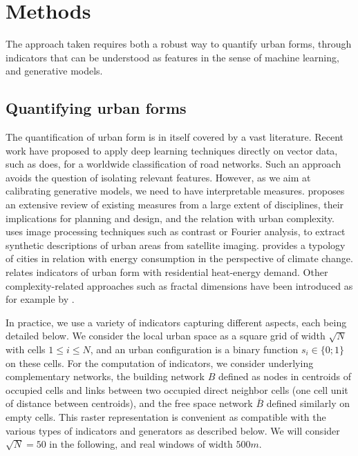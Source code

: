 \documentclass[letterpaper]{article}
\begin{document}
\section{Methods} \label{sec:methods}

The approach taken requires both a robust way to quantify urban forms, through indicators that can be understood as features in the sense of machine learning, and generative models.

\subsection{Quantifying urban forms}

The quantification of urban form is in itself covered by a vast literature.
Recent work have proposed to apply deep learning techniques directly on vector data, such as \cite{2017arXiv170902939M} does, for a worldwide classification of road networks. Such an approach avoids the question of isolating relevant features.
However, as we aim at calibrating generative models, we need to have interpretable measures.
\cite{boeing2018measuring} proposes an extensive review of existing measures from a large extent of disciplines, their implications for planning and design, and the relation with urban complexity. \citep{webster1995urban} uses image processing techniques such as contrast or Fourier analysis, to extract synthetic descriptions of urban areas from satellite imaging. \cite{fumega2014identification} provides a typology of cities in relation with energy consumption in the perspective of climate change. \cite{rode2014cities} relates indicators of urban form with residential heat-energy demand. Other complexity-related approaches such as fractal dimensions have been introduced as for example by \cite{batty1987fractal}.



In practice, we use a variety of indicators capturing different aspects, each being detailed below. We consider the local urban space as a square grid of width $\sqrt{N}$ with cells $1 \leq i \leq N$, and an urban configuration is a binary function $s_i \in \{0;1\}$ on these cells. For the computation of indicators, we consider underlying complementary networks, the building network $B$ defined as nodes in centroids of occupied cells and links between two occupied direct neighbor cells (one cell unit of distance between centroids), and the free space network $\bar{B}$ defined similarly on empty cells. This raster representation is convenient as compatible with the various types of indicators and generators as described below. We will consider $\sqrt{N}=50$ in the following, and real windows of width $500m$.
\end{document}

